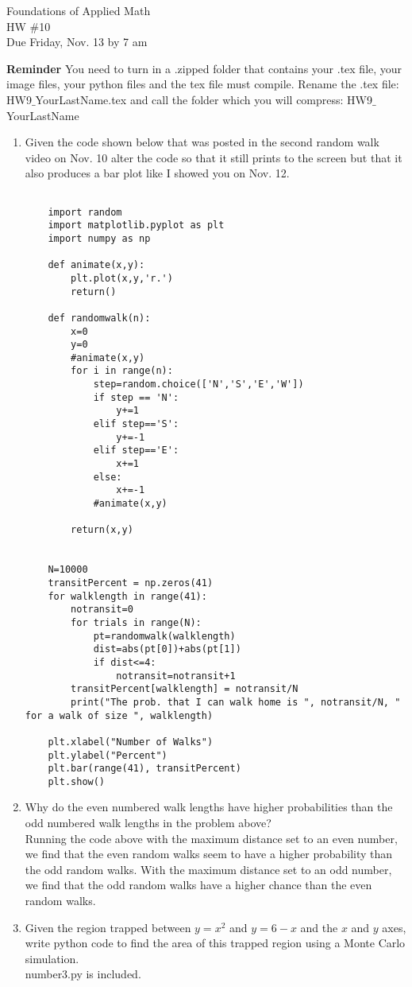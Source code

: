 \documentclass[10pt,letterpaper]{article}
\begin{document}
Foundations of Applied Math\\
 HW \#10\\
 Due Friday, Nov. 13 by 7 am
 
\textbf{Reminder} You need to turn in a .zipped folder that contains your .tex file, your image files, your python files  and the tex file must compile.
Rename the .tex file: HW9$\_$YourLastName.tex and call the folder which you will compress: HW9$\_$YourLastName


\begin{enumerate}

\item 
Given the code shown below that was posted in the second random walk video on Nov. 10 alter the code so that it still prints to the screen but that it also produces a bar plot like I showed you on Nov. 12.

\begin{lstlisting}

    import random
    import matplotlib.pyplot as plt
    import numpy as np
    
    def animate(x,y):
        plt.plot(x,y,'r.')
        return()
    
    def randomwalk(n):
        x=0
        y=0
        #animate(x,y)
        for i in range(n):
            step=random.choice(['N','S','E','W'])
            if step == 'N':
                y+=1
            elif step=='S':
                y+=-1
            elif step=='E':
                x+=1
            else:
                x+=-1
            #animate(x,y)
        
        return(x,y)
    
    
    N=10000
    transitPercent = np.zeros(41)
    for walklength in range(41):
        notransit=0
        for trials in range(N):
            pt=randomwalk(walklength)
            dist=abs(pt[0])+abs(pt[1])
            if dist<=4:
                notransit=notransit+1
        transitPercent[walklength] = notransit/N
        print("The prob. that I can walk home is ", notransit/N, " for a walk of size ", walklength)
        
    plt.xlabel("Number of Walks")
    plt.ylabel("Percent")
    plt.bar(range(41), transitPercent)
    plt.show()

\end{lstlisting}

\item Why do the even numbered walk lengths have higher probabilities than the odd numbered walk lengths in the problem above?
\\
Running the code above with the maximum distance set to an even number, we find that 
the even random walks seem to have a higher probability than the odd random walks. 
With the maximum distance set to an odd number, we find that the odd random walks 
have a higher chance than the even random walks. 
\item  Given the region trapped between $y=x^2$ and $y=6-x$ and the $x$ and $y$ axes, write  python code to find the area of this trapped region using a Monte Carlo simulation.
\\
number3.py is included.



\end{enumerate}
\end{document}
